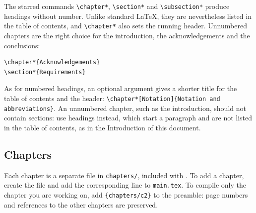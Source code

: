 The starred commands \verb|\chapter*|, \verb|\section*| and
\verb|\subsection*| produce headings without number. Unlike standard
\LaTeX{}, they are nevertheless listed in the table of contents, and
\verb|\chapter*| also sets the running header. Unnumbered chapters are the
right choice for the introduction, the acknowledgements and the
conclusions:
\begin{Verbatim}
\chapter*{Acknowledgements}
\section*{Requirements}
\end{Verbatim}
As for numbered headings, an optional argument gives a shorter title for
the table of contents and the header:
\verb|\chapter*[Notation]{Notation and abbreviations}|. An unnumbered
chapter, such as the introduction, should not contain sections: use
 headings instead, which start a paragraph and are not listed
in the table of contents, as in the Introduction of this document.

\subsection{Chapters}

Each chapter is a separate file in \texttt{chapters/}, included with
. To add a chapter, create the file and add the corresponding
line to \texttt{main.tex}. To compile only the chapter you are working on,
add \verb|{chapters/c2}| to the preamble: page numbers and
references to the other chapters are preserved.

